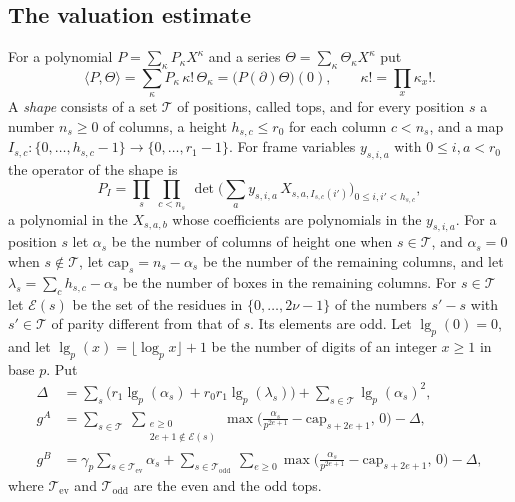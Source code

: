 \subsection{The valuation estimate}\label{sec:valuation}

For a polynomial $P=\sum_\kappa P_\kappa X^\kappa$ and a series $\Theta=\sum_\kappa\Theta_\kappa X^\kappa$ put
\[
\langle P,\Theta\rangle=\sum_\kappa P_\kappa\,\kappa!\,\Theta_\kappa=\big(P(\partial)\Theta\big)(0),\qquad\kappa!=\prod_x\kappa_x! .
\]
A \emph{shape} consists of a set $\mathcal T$ of positions, called tops, and for every position $s$ a number $n_s\ge0$ of columns, a height $h_{s,c}\le r_0$ for each column $c<n_s$, and a map $I_{s,c}\colon\{0,\dots,h_{s,c}-1\}\to\{0,\dots,r_1-1\}$. For frame variables $y_{s,i,a}$ with $0\le i,a<r_0$ the operator of the shape is
\[
P_I=\prod_s\ \prod_{c<n_s}\ \det\Big(\sum_ay_{s,i,a}\,X_{s,a,I_{s,c}(i')}\Big)_{0\le i,i'<h_{s,c}} ,
\]
a polynomial in the $X_{s,a,b}$ whose coefficients are polynomials in the $y_{s,i,a}$. For a position $s$ let $\alpha_s$ be the number of columns of height one when $s\in\mathcal T$, and $\alpha_s=0$ when $s\notin\mathcal T$, let $\mathrm{cap}_s=n_s-\alpha_s$ be the number of the remaining columns, and let $\lambda_s=\sum_ch_{s,c}-\alpha_s$ be the number of boxes in the remaining columns. For $s\in\mathcal T$ let $\mathcal E(s)$ be the set of the residues in $\{0,\dots,2\nu-1\}$ of the numbers $s'-s$ with $s'\in\mathcal T$ of parity different from that of $s$. Its elements are odd. Let $\operatorname{lg}_p(0)=0$, and let $\operatorname{lg}_p(x)=\lfloor\log_px\rfloor+1$ be the number of digits of an integer $x\ge1$ in base $p$. Put
\begin{align}
\Delta&=\sum_s\big(r_1\operatorname{lg}_p(\alpha_s)+r_0r_1\operatorname{lg}_p(\lambda_s)\big)+\sum_{s\in\mathcal T}\operatorname{lg}_p(\alpha_s)^2,\label{Deltadef}\\
g^A&=\sum_{s\in\mathcal T}\ \sum_{\substack{e\ge0\\2e+1\notin\mathcal E(s)}}\max\Big(\frac{\alpha_s}{p^{2e+1}}-\mathrm{cap}_{s+2e+1},\,0\Big)-\Delta,\label{gAdef}\\
g^B&=\gamma_p\sum_{s\in\mathcal T_{\mathrm{ev}}}\alpha_s+\sum_{s\in\mathcal T_{\mathrm{odd}}}\ \sum_{e\ge0}\max\Big(\frac{\alpha_s}{p^{2e+1}}-\mathrm{cap}_{s+2e+1},\,0\Big)-\Delta,\label{gBdef}
\end{align}
where $\mathcal T_{\mathrm{ev}}$ and $\mathcal T_{\mathrm{odd}}$ are the even and the odd tops.

